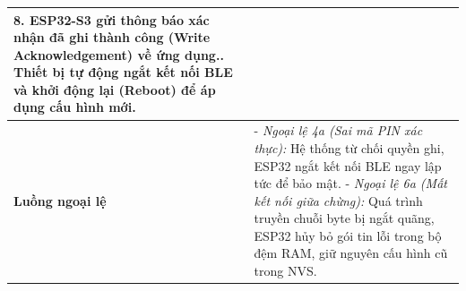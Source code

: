 \begin{table}[htbp]
\begin{tabular}{|p{3.5cm}|p{9.5cm}|}
        8. ESP32-S3 gửi thông báo xác nhận đã ghi thành công (Write Acknowledgement) về ứng dụng.\newline
        9. Thiết bị tự động ngắt kết nối BLE và khởi động lại (Reboot) để áp dụng cấu hình mới. \\ \hline
        \textbf{Luồng ngoại lệ} &
        - \textit{Ngoại lệ 4a (Sai mã PIN xác thực):} Hệ thống từ chối quyền ghi, ESP32 ngắt kết nối BLE ngay lập tức để bảo mật.\newline
        - \textit{Ngoại lệ 6a (Mất kết nối giữa chừng):} Quá trình truyền chuỗi byte bị ngắt quãng, ESP32 hủy bỏ gói tin lỗi trong bộ đệm RAM, giữ nguyên cấu hình cũ trong NVS. \\ \hline
    \end{tabular}
\end{table}